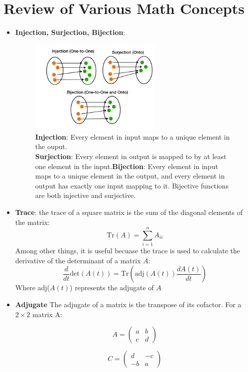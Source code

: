 \documentclass[12pt]{article}
\begin{document}
\section{Review of Various Math Concepts}
\begin{itemize}
\item \textbf{Injection, Surjection, Bijection}: 
	\begin{figure}[H]
	    \centering
	    \includegraphics[width=0.6\textwidth]{./surjection.png} %
		\caption{\textbf{Injection}: Every element in input maps to a unique element in the  ouput. \\ \textbf{Surjection}: Every element in output is mapped to by at least one element in the input.\textbf{Bijection}: Every element in input maps to a unique element in the output, and every element in output has exactly one input mapping to it. Bijective functions are both injective and surjective.}
	\end{figure}
\item \textbf{Trace}: the trace of a square matrix is the sum of the diagonal elements of the matrix:\[\text{Tr}(A) = \sum_{i=1}^n A_{ii}\] Among other things, it is useful becuase the trace is used to calculate the derivative of the determinant of a matrix \(A\): \[\frac{d}{dt}\text{det}(A(t)) = \text{Tr}\left(\text{adj}(A(t)) \frac{dA(t)}{dt}\right)\] Where adj(\(A(t)\)) represents the adjugate of \(A\)
\item \textbf{Adjugate} The adjugate of a matrix is the transpose of its cofactor. For a \(2 \times 2\) matrix A: 

\[ A = 
\begin{pmatrix}
a & b \\
c & d
\end{pmatrix}
\]



\[ C =
\begin{pmatrix}
d & -c \\
-b & a
\end{pmatrix}
\]


\end{itemize}
\end{document}
